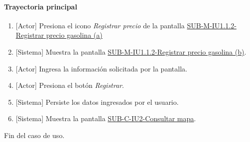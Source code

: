 \paragraph{Trayectoria principal}
	\begin{enumerate}
		\item {[Actor]} Presiona el icono \textit{Registrar precio} de la pantalla \hyperref[fig:sub-m-1.1.2.a]{SUB-M-IU1.1.2-Registrar precio gasolina (a)}
		\item {[Sistema]} Muestra la pantalla \hyperref[fig:sub-m-1.1.2.a]{SUB-M-IU1.1.2-Registrar precio gasolina (b)}.
		\item {[Actor]} Ingresa la información solicitada por la pantalla.
		\item {[Actor]} Presiona el botón \textit{Registrar}.
		\item {[Sistema]} Persiste los datos ingresados por el usuario.
		\item {[Sistema]} Muestra la pantalla \hyperref[fig:sub-c-iu2]{SUB-C-IU2-Consultar mapa}.
	\end{enumerate}
	Fin del caso de uso.